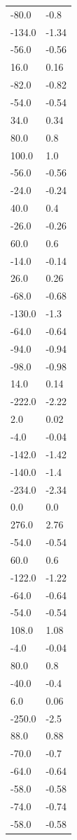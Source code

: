 \begin{longtable}{ll}
-80.0 & -0.8 \\
-134.0 & -1.34 \\
-56.0 & -0.56 \\
16.0 & 0.16 \\
-82.0 & -0.82 \\
-54.0 & -0.54 \\
34.0 & 0.34 \\
80.0 & 0.8 \\
100.0 & 1.0 \\
-56.0 & -0.56 \\
-24.0 & -0.24 \\
40.0 & 0.4 \\
-26.0 & -0.26 \\
60.0 & 0.6 \\
-14.0 & -0.14 \\
26.0 & 0.26 \\
-68.0 & -0.68 \\
-130.0 & -1.3 \\
-64.0 & -0.64 \\
-94.0 & -0.94 \\
-98.0 & -0.98 \\
14.0 & 0.14 \\
-222.0 & -2.22 \\
2.0 & 0.02 \\
-4.0 & -0.04 \\
-142.0 & -1.42 \\
-140.0 & -1.4 \\
-234.0 & -2.34 \\
0.0 & 0.0 \\
276.0 & 2.76 \\
-54.0 & -0.54 \\
60.0 & 0.6 \\
-122.0 & -1.22 \\
-64.0 & -0.64 \\
-54.0 & -0.54 \\
108.0 & 1.08 \\
-4.0 & -0.04 \\
80.0 & 0.8 \\
-40.0 & -0.4 \\
6.0 & 0.06 \\
-250.0 & -2.5 \\
88.0 & 0.88 \\
-70.0 & -0.7 \\
-64.0 & -0.64 \\
-58.0 & -0.58 \\
-74.0 & -0.74 \\
-58.0 & -0.58 \\

\end{longtable}

